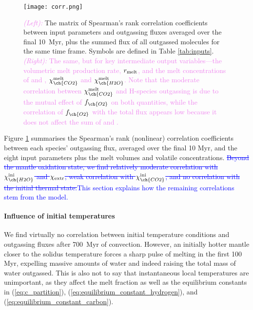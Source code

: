 \documentclass[3p,authoryear]{elsarticle}
\newcommand{\edittwo}[2]{\textcolor{violet}{\sout{#1}#2}}
\newcommand{\editthree}[2]{\textcolor{blue}{\sout{#1}#2}}
\begin{document}
\begin{figure}
\centering
  \texttt{[image: corr.png]}
\caption{\edittwo{}{\textit{(Left):}} The matrix of Spearman's rank correlation coefficients between input parameters and outgassing fluxes averaged over the final 10~Myr, plus the summed flux of all outgassed molecules for the same time frame. Symbols are defined in Table \ref{tab:inputs}. \edittwo{}{\textit{(Right):} The same, but for key intermediate output variables---the volumetric melt production rate, $r_{\rm melt}$, and the melt concentrations of \ch{CO2} and \ch{H2O}, $\chi_{\ch{CO2}}^{\rm melt}$ and $\chi_{\ch{H2O}}^{\rm melt}$. Note that the moderate correlation between $\chi_{\ch{CO2}}^{\rm melt}$ and H-species outgassing is due to the mutual effect of $f_{\ch{O2}}$ on both quantities, while the correlation of $f_{\ch{O2}}$ with the total flux appears low because it does not affect the sum of \ch{H2} and \ch{H2O}.}\label{fig:corr}}
\end{figure}



Figure \ref{fig:corr} summarises the Spearman's rank (nonlinear) correlation coefficients between each species' outgassing flux, averaged over the final 10 Myr, and the eight input parameters plus the melt volumes and volatile concentrations. \editthree{Beyond the mantle oxidation state, we find relatively moderate correlation with $\chi_{\ch{H2O}}^{\rm ini}$ and $\chi_{\rm extr}$, weak correlation with $\chi_{\ch{CO2}}^{\rm ini}$, and no correlation with the initial thermal state.}{This section explains how the remaining correlations stem from the model.}

\paragraph{Influence of initial temperatures}

We find virtually no correlation between initial temperature conditions and outgassing fluxes after 700~Myr of convection. However, an initially hotter mantle closer to the solidus temperature forces a sharp pulse of melting in the first 100 Myr, expelling massive amounts of water and indeed raising the total mass of water outgassed. This is also not to say that instantaneous local temperatures are unimportant, as they affect the melt fraction as well as the equilibrium constants in (\ref{eq:c_partition}), (\ref{eq:equilibrium_constant_hydrogen}), and (\ref{eq:equilibrium_constant_carbon}).
\end{document}
